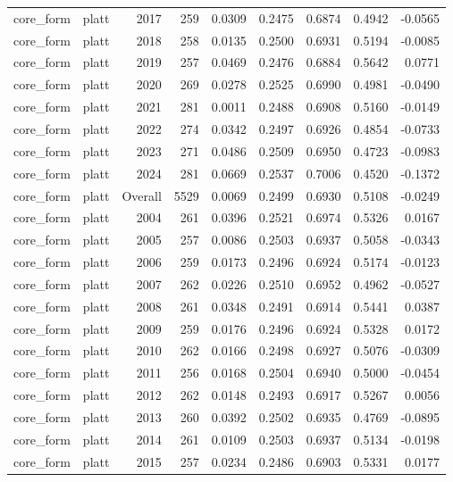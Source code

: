 \begin{table}[t]
\begin{tabular}{@{} l l r r r r r r r @{} }
      core\_form & platt & 2017 & 259 & 0.0309 & 0.2475 & 0.6874 & 0.4942 & -0.0565 \\
      core\_form & platt & 2018 & 258 & 0.0135 & 0.2500 & 0.6931 & 0.5194 & -0.0085 \\
      core\_form & platt & 2019 & 257 & 0.0469 & 0.2476 & 0.6884 & 0.5642 & 0.0771 \\
      core\_form & platt & 2020 & 269 & 0.0278 & 0.2525 & 0.6990 & 0.4981 & -0.0490 \\
      core\_form & platt & 2021 & 281 & 0.0011 & 0.2488 & 0.6908 & 0.5160 & -0.0149 \\
      core\_form & platt & 2022 & 274 & 0.0342 & 0.2497 & 0.6926 & 0.4854 & -0.0733 \\
      core\_form & platt & 2023 & 271 & 0.0486 & 0.2509 & 0.6950 & 0.4723 & -0.0983 \\
      core\_form & platt & 2024 & 281 & 0.0669 & 0.2537 & 0.7006 & 0.4520 & -0.1372 \\
      core\_form & platt & Overall & 5529 & 0.0069 & 0.2499 & 0.6930 & 0.5108 & -0.0249 \\
      core\_form & platt & 2004 & 261 & 0.0396 & 0.2521 & 0.6974 & 0.5326 & 0.0167 \\
      core\_form & platt & 2005 & 257 & 0.0086 & 0.2503 & 0.6937 & 0.5058 & -0.0343 \\
      core\_form & platt & 2006 & 259 & 0.0173 & 0.2496 & 0.6924 & 0.5174 & -0.0123 \\
      core\_form & platt & 2007 & 262 & 0.0226 & 0.2510 & 0.6952 & 0.4962 & -0.0527 \\
      core\_form & platt & 2008 & 261 & 0.0348 & 0.2491 & 0.6914 & 0.5441 & 0.0387 \\
      core\_form & platt & 2009 & 259 & 0.0176 & 0.2496 & 0.6924 & 0.5328 & 0.0172 \\
      core\_form & platt & 2010 & 262 & 0.0166 & 0.2498 & 0.6927 & 0.5076 & -0.0309 \\
      core\_form & platt & 2011 & 256 & 0.0168 & 0.2504 & 0.6940 & 0.5000 & -0.0454 \\
      core\_form & platt & 2012 & 262 & 0.0148 & 0.2493 & 0.6917 & 0.5267 & 0.0056 \\
      core\_form & platt & 2013 & 260 & 0.0392 & 0.2502 & 0.6935 & 0.4769 & -0.0895 \\
      core\_form & platt & 2014 & 261 & 0.0109 & 0.2503 & 0.6937 & 0.5134 & -0.0198 \\
      core\_form & platt & 2015 & 257 & 0.0234 & 0.2486 & 0.6903 & 0.5331 & 0.0177 \\

\end{tabular}
\end{table}
